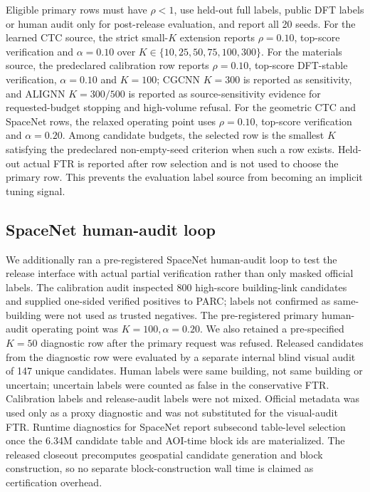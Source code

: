 \documentclass[10pt,twocolumn]{article}
\begin{document}
Eligible primary rows must have \(\rho<1\), use held-out full labels, public DFT labels or human audit only for post-release evaluation, and report all 20 seeds.
For the learned CTC source, the strict small-\(K\) extension reports \(\rho=0.10\), top-score verification and \(\alpha=0.10\) over \(K\in\{10,25,50,75,100,300\}\).
For the materials source, the predeclared calibration row reports \(\rho=0.10\), top-score DFT-stable verification, \(\alpha=0.10\) and \(K=100\); CGCNN \(K=300\) is reported as sensitivity, and ALIGNN \(K=300/500\) is reported as source-sensitivity evidence for requested-budget stopping and high-volume refusal.
For the geometric CTC and SpaceNet rows, the relaxed operating point uses \(\rho=0.10\), top-score verification and \(\alpha=0.20\).
Among candidate budgets, the selected row is the smallest \(K\) satisfying the predeclared non-empty-seed criterion when such a row exists.
Held-out actual FTR is reported after row selection and is not used to choose the primary row.
This prevents the evaluation label source from becoming an implicit tuning signal.

\subsection{SpaceNet human-audit loop}

We additionally ran a pre-registered SpaceNet human-audit loop to test the release interface with actual partial verification rather than only masked official labels.
The calibration audit inspected 800 high-score building-link candidates and supplied one-sided verified positives to PARC; labels not confirmed as same-building were not used as trusted negatives.
The pre-registered primary human-audit operating point was \(K=100,\alpha=0.20\).
We also retained a pre-specified \(K=50\) diagnostic row after the primary request was refused.
Released candidates from the diagnostic row were evaluated by a separate internal blind visual audit of 147 unique candidates.
Human labels were same building, not same building or uncertain; uncertain labels were counted as false in the conservative FTR.
Calibration labels and release-audit labels were not mixed.
Official metadata was used only as a proxy diagnostic and was not substituted for the visual-audit FTR.
Runtime diagnostics for SpaceNet report subsecond table-level selection once the 6.34M candidate table and AOI-time block ids are materialized.
The released closeout precomputes geospatial candidate generation and block construction, so no separate block-construction wall time is claimed as certification overhead.
\end{document}
